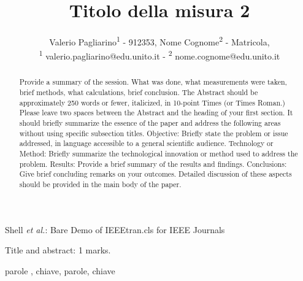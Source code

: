 \documentclass[journal]{IEEEtran}
\begin{document}
\title{Titolo della misura 2\\ 
}

\author{Valerio Pagliarino\textsuperscript{1}
        - 912353,
        Nome Cognome\textsuperscript{2}
        - Matricola,
        {\small \\
        \textsuperscript{1}
        valerio.pagliarino@edu.unito.it  -
        \textsuperscript{2}
        nome.cognome@edu.unito.it
        }}%
        
{Shell \MakeLowercase{\textit{et al.}}: Bare Demo of IEEEtran.cls for IEEE Journals}

\maketitle

\begin{flushright} Title and abstract: 1 marks. \end{flushright}
\begin{abstract} Provide a summary of the session. What was done, 
what measurements were taken, brief methods, what calculations, brief conclusion.  The Abstract should be approximately 250 words or fewer, italicized, in 10-point Times (or Times Roman.) Please leave two spaces between the Abstract and the heading of your first section.
It should briefly summarize the essence of the paper and address the following areas without using specific subsection titles. Objective: Briefly state the problem or issue addressed, in language accessible to a general scientific audience. Technology or Method: Briefly summarize the technological innovation or method used to address the problem. Results: Provide a brief summary of the results and findings. Conclusions: Give brief concluding remarks on your outcomes. Detailed discussion of these aspects should be provided in the main body of the paper. 
\end{abstract}

\begin{IEEEkeywords}
parole , chiave, parole, chiave
\end{IEEEkeywords}
\end{document}
